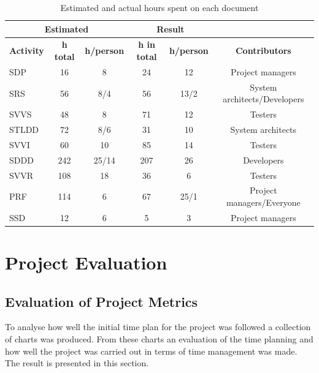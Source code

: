 \documentclass[a4paper]{article}
\begin{document}
\begin{table}[h!]
\centering
\caption{Estimated and actual hours spent on each document}
\begin{tabular}{|l|c|c||c|c|c|}
 \hline
 
\multicolumn{3}{|c||}{\textbf{Estimated}} & \multicolumn{2}{|c|}{\textbf{Result}} & \multicolumn{1}{|c|}{\textbf{}}\\ \hline \hline
\textbf{Activity} & \textbf{h total} & \textbf{h/person} & \textbf{h in total} & \textbf{h/person} & \textbf{Contributors} \\ \hline
SDP & 16 & 8 & 24 & 12 & Project managers \\ \hline
SRS & 56 & 8/4 & 56 & 13/2 & System architects/Developers\\ \hline
SVVS & 48 & 8 & 71 & 12 & Testers \\ \hline
STLDD & 72 & 8/6 & 31 & 10 & System architects\\ \hline
SVVI & 60 & 10 & 85 &14 & Testers\\ \hline 
SDDD & 242 & 25/14 & 207 & 26 & Developers\\ \hline
SVVR & 108 & 18 & 36 & 6 & Testers\\ \hline
PRF & 114 & 6 & 67 & 25/1 & Project managers/Everyone\\ \hline
SSD & 12 & 6 & 5 & 3 & Project managers \\ \hline

\end{tabular}
\label{table:time}
\end{table}




\FloatBarrier
\section{Project Evaluation}


\subsection{Evaluation of Project Metrics}
\label{sec:meval}

To analyse how well the initial time plan for the project was followed a collection of charts was produced. From these charts an evaluation of the time planning and how well the project was carried out in terms of time management was made. The result is presented in this section.   
\end{document}

